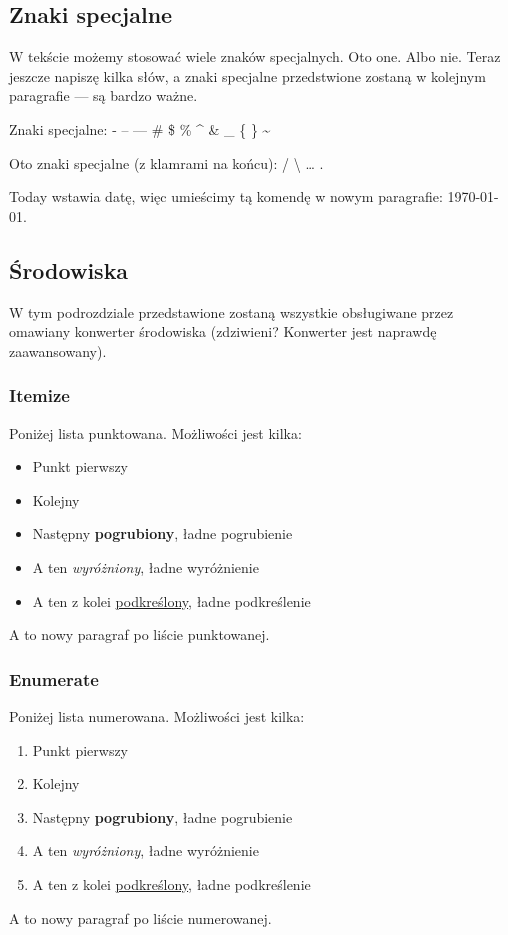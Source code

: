 \documentclass[10pt,a4paper]{article}
\begin{document}
\subsection{Znaki specjalne}
W tekście możemy stosować wiele znaków specjalnych. Oto one. Albo nie. Teraz jeszcze napiszę kilka słów, a znaki specjalne przedstwione zostaną w kolejnym paragrafie --- są bardzo ważne.\par
Znaki specjalne: - -- --- \# \$ \% \^{} \& \_ \{ \} \~{} \par
Oto znaki specjalne (z klamrami na końcu): \slash{} \textbackslash{} \ldots{} \textcelsius{} \texteuro{} \textGamma{} \textDelta{} \textTheta{} \textLambda{} \textPi{} \textSigma{} \textPhi{} \textPsi{} \textOmega{} \textalpha{} \textbeta{} \textgamma{} \textdelta{} \textepsilon{} \texteta{} \texttheta{} \textiota{} \textkappa{} \textlambda{} \textmugreek{} \textnu{} \textxi{} \textpi{} \textrho{} \textsigma{} \texttau{} \textupsilon{} \textphi{} \textchi{} \textpsi{} \textomega{}. \par
Today wstawia datę, więc umieścimy tą komendę w nowym paragrafie: \today{}.

\subsection{Środowiska}
W tym podrozdziale przedstawione zostaną wszystkie obsługiwane przez omawiany konwerter środowiska (zdziwieni? Konwerter jest naprawdę zaawansowany).

\subsubsection{Itemize}
Poniżej lista punktowana. Możliwości jest kilka:
\begin{itemize}
\item Punkt pierwszy
\item Kolejny
\item Następny \textbf{pogrubiony}, ładne pogrubienie
\item A ten \emph{wyróżniony},  ładne wyróżnienie
\item A ten z kolei \underline{podkreślony}, ładne podkreślenie
\end{itemize}
A to nowy paragraf po liście punktowanej.

\subsubsection{Enumerate}
Poniżej lista numerowana. Możliwości jest kilka:
\begin{enumerate}
\item Punkt pierwszy
\item Kolejny
\item Następny \textbf{pogrubiony}, ładne pogrubienie
\item A ten \emph{wyróżniony}, ładne wyróżnienie
\item A ten z kolei \underline{podkreślony}, ładne podkreślenie
\end{enumerate}
A to nowy paragraf po liście numerowanej.
\end{document}
